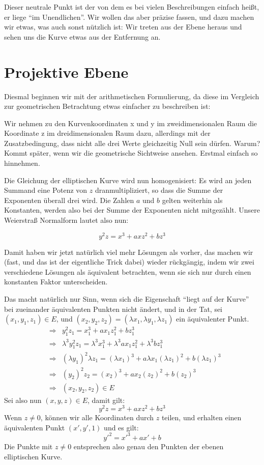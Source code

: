 \documentclass{article}
\newcounter{thm}
\begin{document}
Dieser neutrale Punkt ist der von dem es bei vielen Beschreibungen einfach
heißt, er liege ``im Unendlichen''. Wir wollen das aber präzise fassen, und dazu
machen wir etwas, was auch sonst nützlich ist: Wir treten aus der Ebene heraus
und sehen uns die Kurve etwas aus der Entfernung an.

\section{Projektive Ebene}

Diesmal beginnen wir mit der arithmetischen Formulierung, da diese im
Vergleich zur geometrischen Betrachtung etwas einfacher zu beschreiben ist:

Wir nehmen zu den Kurvenkoordinaten x und y im zweidimensionalen Raum die
Koordinate z im dreidimensionalen Raum dazu, allerdings mit der
Zusatzbedingung, dass nicht alle drei Werte gleichzeitig Null sein dürfen.
Warum? Kommt später, wenn wir die geometrische Sichtweise ansehen. Erstmal
einfach so hinnehmen.

Die Gleichung der elliptischen Kurve wird nun homogenisiert: Es wird an jeden
Summand eine Potenz von $z$ dranmultipliziert, so dass die Summe der
Exponenten überall drei wird. Die Zahlen $a$ und $b$ gelten weiterhin als
Konstanten, werden also bei der Summe der Exponenten nicht mitgezählt. Unsere
Weierstraß Normalform lautet also nun:

$$ y^2z = x^3 + a xz^2 + b z^3 $$

Damit haben wir jetzt natürlich viel mehr Lösungen als vorher, das machen wir
(fast, und das ist der eigentliche Trick dabei) wieder rückgängig, indem wir
zwei verschiedene Lösungen als äquivalent betrachten, wenn sie sich nur durch
einen konstanten Faktor unterscheiden.

Das macht natürlich nur Sinn, wenn sich die Eigenschaft ``liegt auf der Kurve''
bei zueinander äquivalenten Punkten nicht ändert, und in der Tat,
sei $(x_1, y_1, z_1) \in E$, und
$(x_2, y_2, z_2) = (\lambda x_1, \lambda y_1, \lambda z_1)$ ein äquivalenter
Punkt.
\begin{eqnarray*}
    & \Rightarrow &
    y_1^2 z_1 = x_1^3 + a x_1 z_1^2 + b z_1^3 \\
    & \Rightarrow &
    \lambda^3 y_1^2 z_1
    = \lambda^3 x_1^3 + \lambda^3 a x_1 z_1^2 + \lambda^3 b z_1^3 \\
    & \Rightarrow &
    (\lambda y_1)^2 \lambda z_1 = (\lambda x_1)^3
    + a \lambda x_1 (\lambda z_1)^2 + b (\lambda z_1)^3 \\
    & \Rightarrow &
    (y_2)^2 z_2 = (x_2)^3
    + a x_2 (z_2)^2 + b (z_2)^3 \\
    & \Rightarrow & (x_2, y_2, z_2) \in E
\end{eqnarray*}
Sei also nun $(x, y, z) \in E$, damit gilt:
\begin{equation} \label{eq:weipro}
  y^2z = x^3 + a xz^2 + b z^3
\end{equation}
Wenn $z\ne 0$, können wir alle Koordinaten durch $z$ teilen, und erhalten
einen äquivalenten Punkt $(x', y', 1)$ und es gilt:
$$ {y'}^2 = {x'}^3 + ax' + b$$
Die Punkte mit $z \ne 0$ entsprechen also genau den Punkten der ebenen
elliptischen Kurve.
\end{document}
